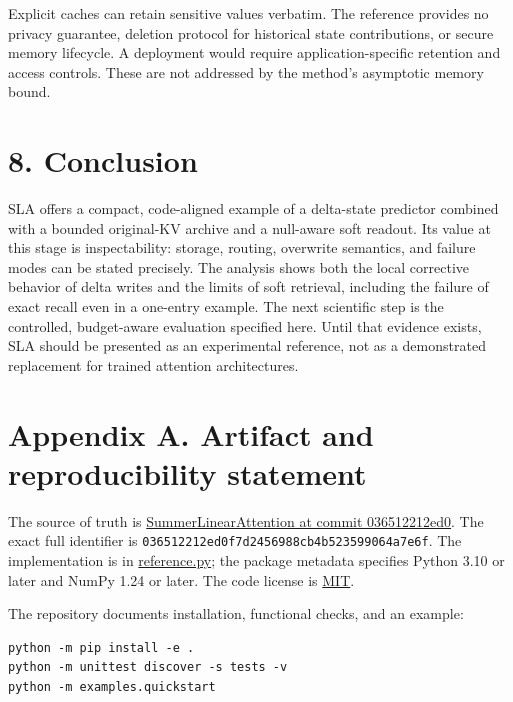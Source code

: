 \documentclass[11pt,a4paper]{article}
\begin{document}
Explicit caches can retain sensitive values verbatim. The reference provides no privacy guarantee, deletion protocol for historical state contributions, or secure memory lifecycle. A deployment would require application-specific retention and access controls. These are not addressed by the method's asymptotic memory bound.

\section{8. Conclusion}\label{conclusion}

SLA offers a compact, code-aligned example of a delta-state predictor combined with a bounded original-KV archive and a null-aware soft readout. Its value at this stage is inspectability: storage, routing, overwrite semantics, and failure modes can be stated precisely. The analysis shows both the local corrective behavior of delta writes and the limits of soft retrieval, including the failure of exact recall even in a one-entry example. The next scientific step is the controlled, budget-aware evaluation specified here. Until that evidence exists, SLA should be presented as an experimental reference, not as a demonstrated replacement for trained attention architectures.

\section{Appendix A. Artifact and reproducibility statement}\label{appendix-a.-artifact-and-reproducibility-statement}

The source of truth is \href{https://github.com/Summer110622/SummerLinearAttention/tree/036512212ed0f7d2456988cb4b523599064a7e6f}{SummerLinearAttention at commit 036512212ed0}. The exact full identifier is \texttt{\nolinkurl{036512212ed0f7d2456988cb4b523599064a7e6f}}. The implementation is in \href{https://github.com/Summer110622/SummerLinearAttention/blob/036512212ed0f7d2456988cb4b523599064a7e6f/summer_linear_attention/reference.py}{reference.py}; the package metadata specifies Python 3.10 or later and NumPy 1.24 or later. The code license is \href{https://github.com/Summer110622/SummerLinearAttention/blob/036512212ed0f7d2456988cb4b523599064a7e6f/LICENSE}{MIT}.

The repository documents installation, functional checks, and an example:

\begin{minipage}{\linewidth}

\begin{verbatim}
python -m pip install -e .
python -m unittest discover -s tests -v
python -m examples.quickstart
\end{verbatim}

\end{minipage}
\end{document}
